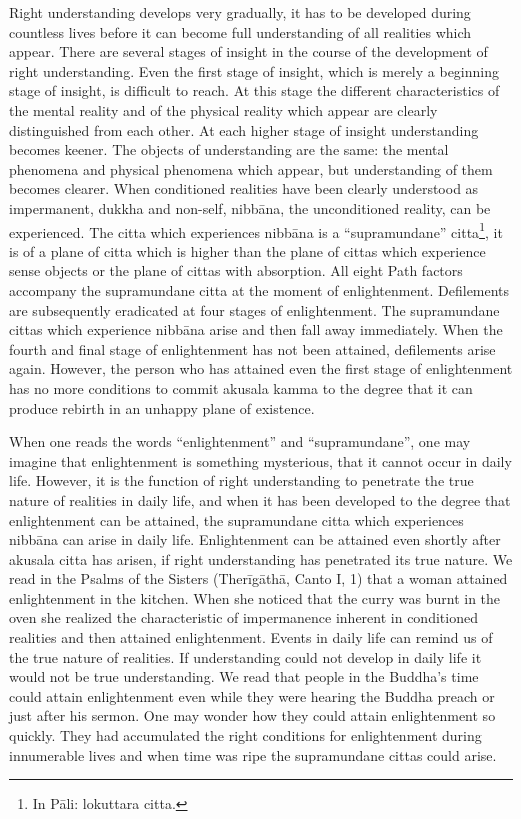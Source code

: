 \documentclass{book}
\begin{document}
Right understanding develops very gradually, it has to be developed
during countless lives before it can become full understanding of all
realities which appear. There are several stages of insight in the
course of the development of right understanding. Even the first stage
of insight, which is merely a beginning stage of insight, is difficult
to reach. At this stage the different characteristics of the mental
reality and of the physical reality which appear are clearly
distinguished from each other. At each higher stage of insight
understanding becomes keener. The objects of understanding are the same:
the mental phenomena and physical phenomena which appear, but
understanding of them becomes clearer. When conditioned realities have
been clearly understood as impermanent, dukkha and non-self, nibbāna,   the uncon­di­tioned reality, can be experienced. The citta
which experiences nib­bāna is a ``supramundane'' citta\footnote
{In Pāli: lokuttara citta.}, it is of a plane of citta which is higher than the plane of cittas which experience sense objects or the plane of cittas with absorp­tion. All eight Path factors accompany the supra­mundane citta at the moment of enlightenment. Defile­ments are subse­quently eradicated at four stages of enlightenment. The 
supramundane cittas which expe­rience nibbāna arise and then fall away imme­diately. When the fourth and final stage of enlightenment has not been attained, defilements arise again. However, the person who has attained even the first stage of enlightenment has no more conditions to commit akusala kamma to the degree that it can produce rebirth in an unhappy plane of existence.

When one reads the words ``enlightenment'' and ``supramundane'', one may
imagine that enlightenment is something mysterious, that it cannot occur
in daily life. However, it is the function of right understanding to
penetrate the true nature of realities in daily life, and when it has
been developed to the degree that enlighten­ment can be attained, the
supramundane citta which experiences nibbāna can arise in daily life.
Enlightenment can be attained even shortly after akusala citta has
arisen, if right understanding has penetrated its true nature. We read
in the Psalms of the Sisters (Therīgāthā, Canto I, 1) that a woman
attained enlighten­ment in the kitchen. When she noticed that the curry
was burnt in the oven she realized the characteristic of impermanence
inherent in conditioned realities and then attained enlightenment.
Events in daily life can remind us of the true nature of realities. If
understanding could not develop in daily life it would not be true
understanding. We read that people in the Buddha's time could attain
enlightenment even while they were hearing the Buddha preach or just
after his sermon. One may wonder how they could attain enlighten­ment so
quickly. They had accumulated the right condi­tions for enlightenment
during innumerable lives and when time was ripe the supramundane cittas
could arise.
\end{document}
